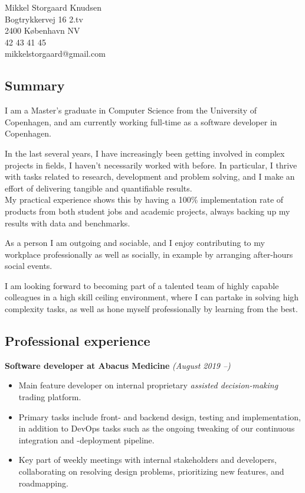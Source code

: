 \documentclass[10pt, a4paper]{article}
\begin{document}
Mikkel Storgaard Knudsen \\
Bogtrykkervej 16 2.tv \\
2400 København NV \\
42 43 41 45 \\
mikkelstorgaard@gmail.com

\subsection*{Summary}
I am a Master's graduate in Computer Science from the University of Copenhagen,
and am currently working full-time as a software developer in Copenhagen.

In the last several years, I have increasingly been getting involved in complex
projects in fields, I haven't necessarily worked with before. In particular, I thrive with tasks related to
research, development and problem solving, and I make an effort of delivering
tangible and quantifiable results.\\
My practical experience shows this by having a 100\% implementation rate of products
from both student jobs and academic projects, always backing up my results with
data and benchmarks.

As a person I am outgoing and sociable, and I enjoy contributing to my
workplace professionally as well as socially, in example by arranging after-hours social
events.

I am looking forward to becoming part of a talented team of highly capable
colleagues in a high skill ceiling environment, where I can partake in solving high
complexity tasks, as well as hone myself professionally by learning from the
best.

\subsection*{Professional experience}
\textbf{Software developer at Abacus Medicine} \textit{(August 2019 --)}
  \begin{itemize}[topsep=0pt]
  \item Main feature developer on internal proprietary \textit{assisted
      decision-making} trading platform.

  \item Primary tasks include front- and backend design, testing and
    implementation, in addition to DevOps tasks such as the ongoing tweaking
    of our continuous integration and -deployment pipeline.

  \item Key part of weekly meetings with internal stakeholders and developers, collaborating
    on resolving design problems, prioritizing new features, and roadmapping. 
  \end{itemize}
\end{document}

